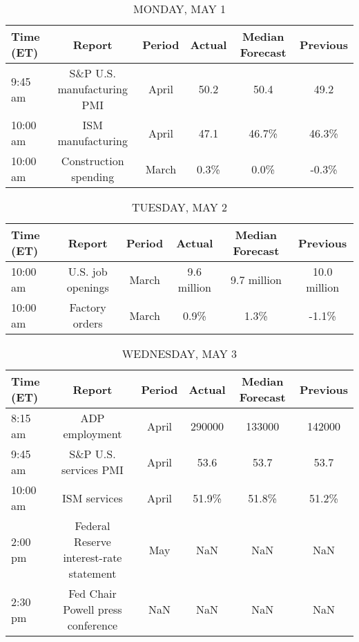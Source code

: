 \documentclass{article}%
\begin{document}
%
\normalsize%


\begin{table}[htbp]%
\caption{MONDAY, MAY 1}%
\centering%
\begin{adjustbox}{width=1\textwidth}%
\begin{tabular}{lccccc}
\toprule
Time (ET) &                     Report & Period & Actual & Median Forecast & Previous \\
\midrule
  9:45 am & S\&P U.S. manufacturing PMI &  April &   50.2 &            50.4 &     49.2 \\
 10:00 am &          ISM manufacturing &  April &   47.1 &           46.7\% &    46.3\% \\
 10:00 am &      Construction spending &  March &   0.3\% &            0.0\% &    -0.3\% \\
\bottomrule
\end{tabular}
%
\end{adjustbox}%
\end{table}

%


\begin{table}[htbp]%
\caption{TUESDAY, MAY 2}%
\centering%
\begin{adjustbox}{width=1\textwidth}%
\begin{tabular}{lccccc}
\toprule
Time (ET) &            Report & Period &      Actual & Median Forecast &     Previous \\
\midrule
 10:00 am & U.S. job openings &  March & 9.6 million &     9.7 million & 10.0 million \\
 10:00 am &    Factory orders &  March &        0.9\% &            1.3\% &        -1.1\% \\
\bottomrule
\end{tabular}
%
\end{adjustbox}%
\end{table}

%


\begin{table}[htbp]%
\caption{WEDNESDAY, MAY 3}%
\centering%
\begin{adjustbox}{width=1\textwidth}%
\begin{tabular}{lccccc}
\toprule
Time (ET) &                                  Report & Period & Actual & Median Forecast & Previous \\
\midrule
  8:15 am &                          ADP employment &  April & 290000 &          133000 &   142000 \\
  9:45 am &                   S\&P U.S. services PMI &  April &   53.6 &            53.7 &     53.7 \\
 10:00 am &                            ISM services &  April &  51.9\% &           51.8\% &    51.2\% \\
  2:00 pm & Federal Reserve interest-rate statement &    May &    NaN &             NaN &      NaN \\
  2:30 pm &       Fed Chair Powell press conference &    NaN &    NaN &             NaN &      NaN \\
\bottomrule
\end{tabular}
%
\end{adjustbox}%
\end{table}
\end{document}
